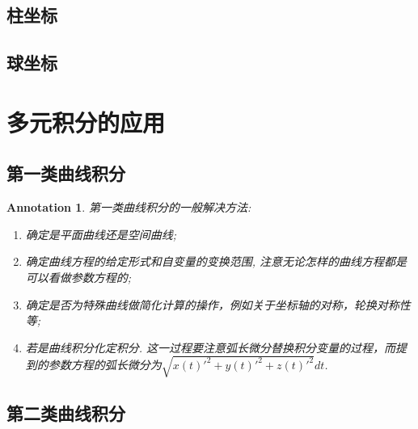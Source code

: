 \documentclass{article}
\newtheorem{annotation}[theorem]{Annotation}
\begin{document}
\subsection{柱坐标}

\subsection{球坐标}


\newpage
\section{多元积分的应用}

\subsection{第一类曲线积分}

\begin{annotation}
\rm 第一类曲线积分的一般解决方法:
\begin{enumerate}
	\item 确定是平面曲线还是空间曲线;
	\item 确定曲线方程的给定形式和自变量的变换范围, 注意无论怎样的曲线方程都是可以看做参数方程的;
	\item 确定是否为特殊曲线做简化计算的操作，例如关于坐标轴的对称，轮换对称性等;
	\item 若是曲线积分化定积分. 这一过程要注意弧长微分替换积分变量的过程，而提到的参数方程的弧长微分为$\sqrt{x(t)'^2 + y(t)'^2 + z(t)'^2}dt$.  
\end{enumerate}
\end{annotation}

\subsection{第二类曲线积分}
\end{document}
